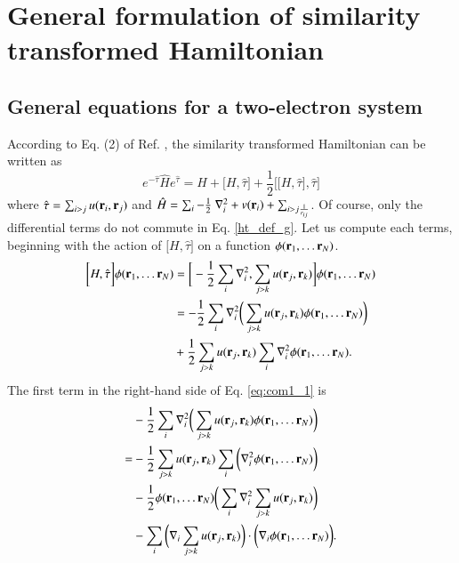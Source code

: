 \documentclass[aip,jcp,reprint,noshowkeys,superscriptaddress]{revtex4-1}
\newcommand{\br}[0]{{\bf {r}}}
\begin{document}
\section{General formulation of similarity transformed Hamiltonian}
\subsection{General equations for a two-electron system}
According to Eq. (2) of Ref. , the similarity transformed Hamiltonian can be written as 
\begin{equation}
 \label{ht_def_g}
 e^{-\hat{\tau}} \hat{H} e^{\hat{\tau}} = H + \big[ H,\hat{\tau} \big] + \frac{1}{2}\bigg[ \big[H,\hat{\tau}\big],\hat{\tau}\bigg]
\end{equation}
where $\hat{\tau} = \sum_{i>j}u(\br{}_i,\br{}_j)$ and $\hat{H} = \sum_i -\frac{1}{2} \nabla^2_i + v(\br{}_i) + \sum_{i>j \frac{1}{r_{ij}}}$. Of course, only the differential terms do not commute in Eq. \eqref{ht_def_g}. 
Let us compute each terms, beginning with the action of $\big[ H,\hat{\tau} \big]$ on a function $\phi(\br{}_1,\hdots \br{}_N)$.
\begin{equation}
 \label{eq:com1_1}
 \begin{aligned}
 \bigg[ H,\hat{\tau} \bigg]\phi(\br{}_1,\hdots \br{}_N) & = \bigg[ -\frac{1}{2} \sum_i \nabla^2_i, \sum_{j>k} u(\br{}_j,\br{}_k) \bigg] \phi(\br{}_1,\hdots \br{}_N) \\
  & = -\frac{1}{2} \sum_i \nabla^2_i\bigg( \sum_{j>k} u(\br{}_j,\br{}_k) \phi(\br{}_1,\hdots \br{}_N) \bigg) \\
  & +  \frac{1}{2} \sum_{j>k} u(\br{}_j,\br{}_k) \sum_i \nabla^2_i \phi(\br{}_1,\hdots \br{}_N). 
 \end{aligned}
\end{equation}
The first term in the right-hand side of Eq. \eqref{eq:com1_1} is 
\begin{equation}
 \label{eq:com1_2}
 \begin{aligned}
&  -\frac{1}{2} \sum_i \nabla^2_i\bigg( \sum_{j>k} u(\br{}_j,\br{}_k) \phi(\br{}_1,\hdots \br{}_N) \bigg) \\ 
= &-\frac{1}{2}\sum_{j>k} u(\br{}_j,\br{}_k) \sum_i \bigg( \nabla^2_i \phi(\br{}_1,\hdots \br{}_N)\bigg) \\
  &-\frac{1}{2}\phi(\br{}_1,\hdots \br{}_N) \bigg( \sum_i \nabla^2_i \sum_{j>k} u(\br{}_j,\br{}_k) \bigg) \\
  &-\sum_i \bigg(\nabla_i \sum_{j>k}u(\br{}_j,\br{}_k) \bigg) \cdot \bigg( \nabla_i \phi(\br{}_1,\hdots \br{}_N) \bigg).
 \end{aligned}
\end{equation}
\end{document}
